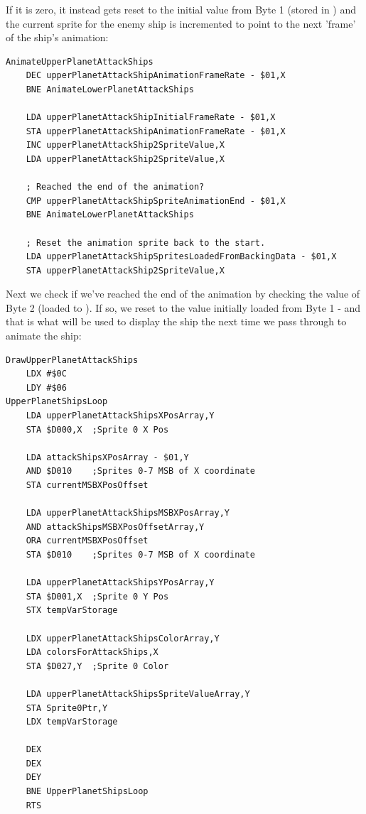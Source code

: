 If it is zero, it instead gets reset to the initial value from Byte 1 (stored in
 )
and the current sprite for the enemy ship is incremented to point to the next 'frame' of the ship's animation:

\begin{lstlisting}
AnimateUpperPlanetAttackShips   
    DEC upperPlanetAttackShipAnimationFrameRate - $01,X
    BNE AnimateLowerPlanetAttackShips

    LDA upperPlanetAttackShipInitialFrameRate - $01,X
    STA upperPlanetAttackShipAnimationFrameRate - $01,X
    INC upperPlanetAttackShip2SpriteValue,X
    LDA upperPlanetAttackShip2SpriteValue,X

    ; Reached the end of the animation?
    CMP upperPlanetAttackShipSpriteAnimationEnd - $01,X
    BNE AnimateLowerPlanetAttackShips

    ; Reset the animation sprite back to the start.
    LDA upperPlanetAttackShipSpritesLoadedFromBackingData - $01,X
    STA upperPlanetAttackShip2SpriteValue,X
\end{lstlisting}

Next we check if we've reached the end of the animation by checking the value
of Byte 2 (loaded to ).  If so,
we reset  to the value initially
loaded from Byte 1 - and that is what will be used to display the ship the next
time we pass through to animate the ship:

\begin{lstlisting}
DrawUpperPlanetAttackShips
    LDX #$0C
    LDY #$06
UpperPlanetShipsLoop   
    LDA upperPlanetAttackShipsXPosArray,Y
    STA $D000,X  ;Sprite 0 X Pos

    LDA attackShipsXPosArray - $01,Y
    AND $D010    ;Sprites 0-7 MSB of X coordinate
    STA currentMSBXPosOffset

    LDA upperPlanetAttackShipsMSBXPosArray,Y
    AND attackShipsMSBXPosOffsetArray,Y
    ORA currentMSBXPosOffset
    STA $D010    ;Sprites 0-7 MSB of X coordinate

    LDA upperPlanetAttackShipsYPosArray,Y
    STA $D001,X  ;Sprite 0 Y Pos
    STX tempVarStorage

    LDX upperPlanetAttackShipsColorArray,Y
    LDA colorsForAttackShips,X
    STA $D027,Y  ;Sprite 0 Color

    LDA upperPlanetAttackShipsSpriteValueArray,Y
    STA Sprite0Ptr,Y
    LDX tempVarStorage

    DEX
    DEX
    DEY
    BNE UpperPlanetShipsLoop
    RTS
\end{lstlisting}

